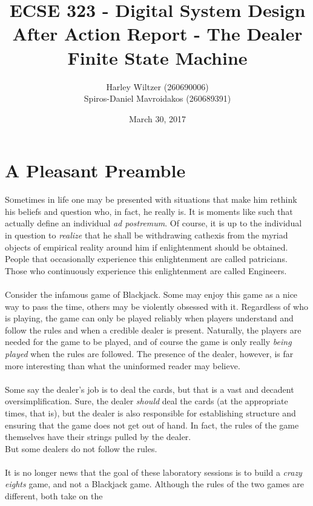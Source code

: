 \documentclass[12pt]{report}
\title{ECSE 323 - Digital System Design\\After Action Report - The Dealer Finite State Machine}
\author{Harley Wiltzer (260690006)\\Spiros-Daniel Mavroidakos (260689391)}
\date{March 30, 2017}
\begin{document}
\maketitle
\newpage
\pagestyle{fancy}
\fancyhf{}
\tableofcontents

\part{A Pleasant Preamble}
\lettrine{S}ometimes in life one may be presented with situations that make him rethink his beliefs and
question who, in fact, he really is. It is moments like such that actually define an individual
\textit{ad postremum}. Of course, it is up to the individual in question to \textit{realize} that he shall be
withdrawing cathexis from the myriad objects of empirical reality around him if enlightenment should
be obtained. People that occasionally experience this enlightenment are called patricians. Those who
continuously experience this enlightenment are called Engineers.\\\\
Consider the infamous game of Blackjack. Some may enjoy this game as a nice way to pass the time,
others may be violently obsessed with it. Regardless of who is playing, the game can only be played
reliably when players understand and follow the rules and when a credible dealer is present.
Naturally, the players are needed for the game to be played, and of course the game is only really
\textit{being played} when the rules are followed. The presence of the dealer, however, is far more
interesting than what the uninformed reader may believe.\\\\
Some say the dealer's job is to deal the cards, but that is a vast and decadent oversimplification.
Sure, the dealer \textit{should} deal the cards (at the appropriate times, that is), but the dealer
is also responsible for establishing structure and ensuring that the game does not get out of hand.
In fact, the rules of the game themselves have their strings pulled by the dealer. \\But some dealers
do not follow the rules.\\\\
It is no longer news that the goal of these laboratory sessions is to build a \textit{crazy eights}
game, and not a Blackjack game. Although the rules of the two games are different, both take on the
\end{document}
